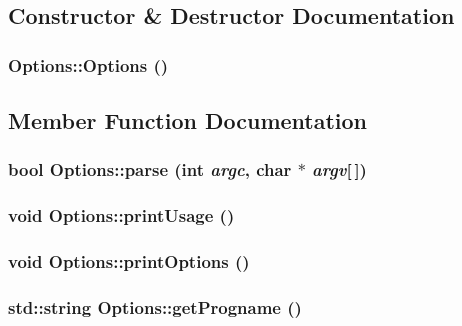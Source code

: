 \subsection{Constructor \& Destructor Documentation}
\subsubsection{\setlength{\rightskip}{0pt plus 5cm}Options::Options ()}\label{classOptions_b72fb640172a6109e34c8a5366563753}




\subsection{Member Function Documentation}
\subsubsection{\setlength{\rightskip}{0pt plus 5cm}bool Options::parse (int {\em argc}, char $\ast$ {\em argv}[$\,$])}\label{classOptions_eef7f9799ffcc31221a54dc9ed3b3e81}


\subsubsection{\setlength{\rightskip}{0pt plus 5cm}void Options::print\-Usage ()}\label{classOptions_5a64af47966f3c0a54a8c3a3385065e3}


\subsubsection{\setlength{\rightskip}{0pt plus 5cm}void Options::print\-Options ()}\label{classOptions_cac40a32d05b48e49595d8d19cf8af47}


\subsubsection{\setlength{\rightskip}{0pt plus 5cm}std::string Options::get\-Progname ()}\label{classOptions_af7b2ab27fc4b1a74ef89e9fdd0cfb22}


